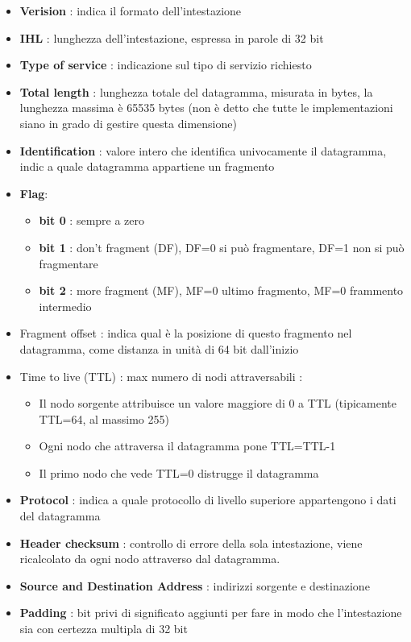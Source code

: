 \documentclass{report}
\begin{document}
        \begin{itemize}
            \item \textbf{Verision} : indica il formato dell'intestazione
            \item \textbf{IHL} : lunghezza dell'intestazione, espressa in parole di 32 bit
            \item \textbf{Type of service} : indicazione sul tipo di servizio richiesto
            \item \textbf{Total length} : lunghezza totale del datagramma, misurata in bytes, la lunghezza massima è 65535 bytes (non è detto che tutte le implementazioni siano in grado di gestire questa dimensione)
            \item \textbf{Identification} : valore intero che identifica univocamente il datagramma, indic a quale datagramma appartiene un fragmento
            \item \textbf{Flag}: 
                \begin{itemize}
                    \item \textbf{bit 0} : sempre a zero
                    \item \textbf{bit 1} : don't fragment (DF), DF=0 si può fragmentare, DF=1 non si può fragmentare
                    \item \textbf{bit 2} : more fragment (MF), MF=0 ultimo fragmento, MF=0 frammento intermedio
                \end{itemize}
            \item Fragment offset : indica qual è la posizione di questo fragmento nel datagramma, come distanza in unità di 64 bit dall'inizio
            \item Time to live (TTL) : max numero di nodi attraversabili :
                \begin{itemize}
                    \item Il nodo sorgente attribuisce un valore maggiore di 0 a TTL (tipicamente TTL=64, al massimo 255)
                    \item Ogni nodo che attraversa il datagramma pone TTL=TTL-1
                    \item Il primo nodo che vede TTL=0 distrugge il datagramma
                \end{itemize}
            \item \textbf{Protocol} : indica a quale protocollo di livello superiore appartengono i dati del datagramma
            \item \textbf{Header checksum} : controllo di errore della sola intestazione, viene ricalcolato da ogni nodo attraverso dal datagramma.
            \item \textbf{Source and Destination Address} : indirizzi sorgente e destinazione
            \item \textbf{Padding} : bit privi di significato aggiunti per fare in modo che l'intestazione sia con certezza multipla di 32 bit
        \end{itemize}
\end{document}
